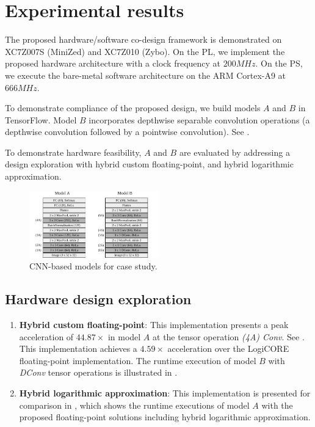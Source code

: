 \section{Experimental results}
\label{sec:experimental_results}
The proposed hardware/software co-design framework is demonstrated on XC7Z007S (MiniZed) and XC7Z010 (Zybo). On the PL, we implement the proposed hardware architecture with a clock frequency at $200 MHz$. On the PS, we execute the bare-metal software architecture on the ARM Cortex-A9 at $666MHz$.

To demonstrate compliance of the proposed design, we build models $A$ and $B$ in TensorFlow. Model $B$ incorporates depthwise separable convolution operations (a depthwise convolution followed by a pointwise convolution). See .

To demonstrate hardware feasibility, $A$ and $B$ are evaluated by addressing a design exploration with hybrid custom floating-point, and hybrid logarithmic approximation.


\begin{figure}[t!]
	\centering
	\includegraphics[width=0.5\textwidth]{../figures/models.pdf}
	\caption{CNN-based models for case study.}
	\label{fig:models}
\end{figure}

\subsection{Hardware design exploration}
\begin{enumerate}
\item{\textbf{Hybrid custom floating-point}}: This implementation presents a peak acceleration of $44.87\times$ in model $A$ at the tensor operation \emph{(4A) Conv}. See . This implementation achieves a $4.59\times$ acceleration over the LogiCORE floating-point implementation. The runtime execution of model $B$ with \emph{DConv} tensor operations is illustrated in .

\item{\textbf{Hybrid logarithmic approximation}}: This implementation is presented for comparison in , which shows the runtime executions of model $A$ with the proposed floating-point solutions including hybrid logarithmic approximation.
\end{enumerate}



